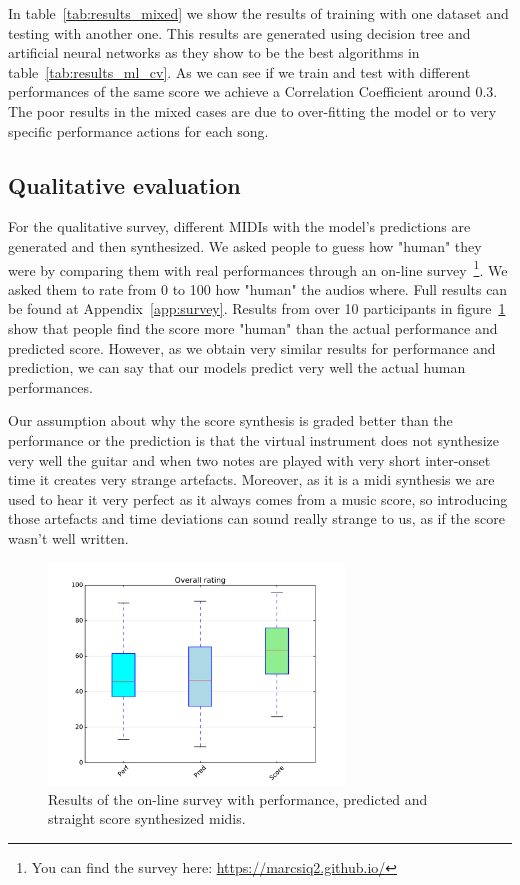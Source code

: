 
%
In table~\ref{tab:results_mixed} we show the results of training with one dataset and testing with another one. This results are generated using decision tree and artificial neural networks as they show to be the best algorithms in table~\ref{tab:results_ml_cv}. As we can see if we train and test with different performances of the same score we achieve a Correlation Coefficient around 0.3. The poor results in the mixed cases are due to over-fitting the model or to very specific performance actions for each song.


\subsection{Qualitative evaluation}

For the qualitative survey, different MIDIs with the model's predictions are generated and then synthesized. We asked people to guess how "human" they were by comparing them with real performances through an on-line survey~\footnote{You can find the survey here: \url{https://marcsiq2.github.io/}}. We asked them to rate from 0 to 100 how "human" the audios where. Full results can be found at Appendix~\ref{app:survey}. Results from over 10 participants in figure~\ref{fig:survey} show that people find the score more "human" than the actual performance and predicted score. However, as we obtain very similar results for performance and prediction, we can say that our models predict very well the actual human performances. 

Our assumption about why the score synthesis is graded better than the performance or the prediction is that the virtual instrument does not synthesize very well the guitar and when two notes are played with very short inter-onset time it creates very strange artefacts. Moreover, as it is a midi synthesis we are used to hear it very perfect as it always comes from a music score, so introducing those artefacts and time deviations can sound really strange to us, as if the score wasn't well written.

\begin{figure}[ht!]
\caption{Results of the on-line survey with performance, predicted and straight score synthesized midis.}
\label{fig:survey}
\centering
\includegraphics[width=0.7\textwidth]{Figures/survey.pdf}
\end{figure}


\cleardoublepage


